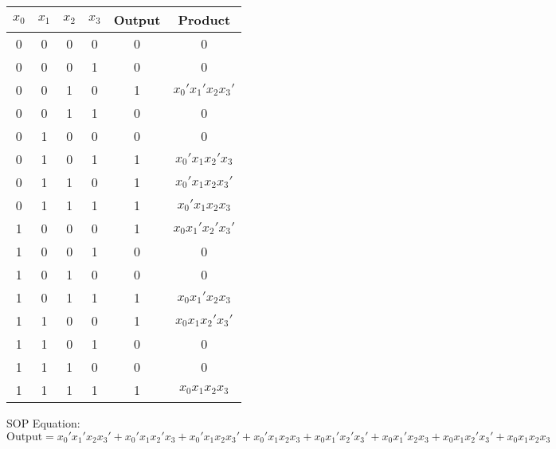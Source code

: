\documentclass[12pt]{report}
\begin{document}
\begin{tabular}{ |c|c|c|c|c|c| }
\hline
$x_0$ & $x_1$ & $x_2$ & $x_3$ & Output & Product \\
\hline
0 & 0 & 0 & 0 & 0 & 0 \\
0 & 0 & 0 & 1 & 0 & 0 \\
0 & 0 & 1 & 0 & 1 & $x_0'x_1'x_2x_3'$ \\
0 & 0 & 1 & 1 & 0 & 0 \\
0 & 1 & 0 & 0 & 0 & 0 \\
0 & 1 & 0 & 1 & 1 & $x_0'x_1x_2'x_3$ \\
0 & 1 & 1 & 0 & 1 & $x_0'x_1x_2x_3'$ \\
0 & 1 & 1 & 1 & 1 & $x_0'x_1x_2x_3$ \\
1 & 0 & 0 & 0 & 1 & $x_0x_1'x_2'x_3'$ \\
1 & 0 & 0 & 1 & 0 & 0 \\
1 & 0 & 1 & 0 & 0 & 0 \\
1 & 0 & 1 & 1 & 1 & $x_0x_1'x_2x_3$ \\
1 & 1 & 0 & 0 & 1 & $x_0x_1x_2'x_3'$ \\
1 & 1 & 0 & 1 & 0 & 0 \\
1 & 1 & 1 & 0 & 0 & 0 \\
1 & 1 & 1 & 1 & 1 & $x_0x_1x_2x_3$ \\
\hline
\end{tabular}

SOP Equation: $\textrm{Output} = x_0'x_1'x_2x_3' + x_0'x_1x_2'x_3 + x_0'x_1x_2x_3' + x_0'x_1x_2x_3 + x_0x_1'x_2'x_3' + x_0x_1'x_2x_3 + x_0x_1x_2'x_3' + x_0x_1x_2x_3$
\end{document}
